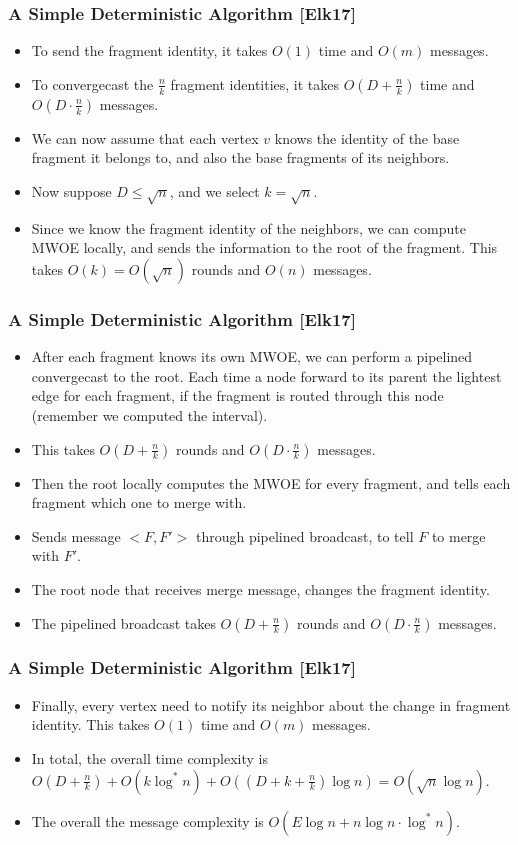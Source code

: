 \begin{frame}
\frametitle{A Simple Deterministic Algorithm [Elk17]}
\begin{itemize}
    \item To send the fragment identity, it takes $O(1)$ time and $O(m)$ messages.
    \item To convergecast the $\frac{n}{k}$ fragment identities, it takes $O(D+\frac{n}{k})$ time and $O(D \cdot\frac{n}{k})$ messages.
    \item We can now assume that each vertex $v$ knows the identity of the base fragment it belongs to, and also the base fragments of its neighbors.
    \item Now suppose $D \le \sqrt{n}$, and we select $k=\sqrt{n}$.
    \item Since we know the fragment identity of the neighbors, we can compute MWOE locally, and sends the information to the root of the fragment. This takes $O(k)=O(\sqrt{n})$ rounds and $O(n)$ messages.
\end{itemize}
\end{frame}


\begin{frame}
\frametitle{A Simple Deterministic Algorithm [Elk17]}
\begin{itemize}
    \item After each fragment knows its own MWOE, we can perform a pipelined convergecast to the root. Each time a node forward to its parent the lightest edge for each fragment, if the fragment is routed through this node (remember we computed the interval).
    \item This takes $O(D+\frac{n}{k})$ rounds and $O(D \cdot \frac{n}{k})$ messages.
    \item Then the root locally computes the MWOE for every fragment, and tells each fragment which one to merge with.
    \item Sends message $<F,F'>$ through pipelined broadcast, to tell $F$ to merge with $F'$.
    \item The root node that receives merge message, changes the fragment identity.
    \item The pipelined broadcast takes $O(D+\frac{n}{k})$ rounds and $O(D \cdot \frac{n}{k})$ messages.
\end{itemize}
\end{frame}


\begin{frame}
\frametitle{A Simple Deterministic Algorithm [Elk17]}
\begin{itemize}
    \item Finally, every vertex need to notify its neighbor about the change in fragment identity. This takes $O(1)$ time and $O(m)$ messages.
    \item In total, the overall time complexity is $O(D+\frac{n}{k}) + O(k\log^* n) + O((D + k + \frac{n}{k})\log n) = O(\sqrt{n}\log n)$.
    \item The overall the message complexity is $O(E \log n + n\log n \cdot \log^* n)$.
\end{itemize}
\end{frame}

